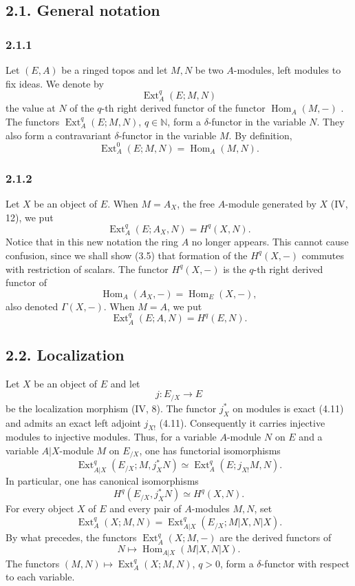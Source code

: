 \documentclass[11pt]{article}
\newcommand{\NN}{\mathbb N}
\newcommand{\Hom}{\operatorname{Hom}}
\newcommand{\Ext}{\operatorname{Ext}}
\begin{document}
\subsection*{2.1. General notation}

\subsubsection*{2.1.1}
Let $(E,A)$ be a ringed topos and let $M,N$ be two $A$-modules, left modules to fix ideas. We denote by
\[
\Ext_A^q(E;M,N)
\]
the value at $N$ of the $q$-th right derived functor of the functor $\Hom_A(M,-)$ \cite{11}. The functors $\Ext_A^q(E;M,N)$, $q\in\NN$, form a $\delta$-functor in the variable $N$. They also form a contravariant $\delta$-functor in the variable $M$. By definition,
\[
\Ext_A^0(E;M,N)=\Hom_A(M,N).
\]

\subsubsection*{2.1.2}
Let $X$ be an object of $E$. When $M=A_X$, the free $A$-module generated by $X$ (IV, 12), we put
\[
\Ext_A^q(E;A_X,N)=H^q(X,N).
\]
Notice that in this new notation the ring $A$ no longer appears. This cannot cause confusion, since we shall show (3.5) that formation of the $H^q(X,-)$ commutes with restriction of scalars. The functor $H^q(X,-)$ is the $q$-th right derived functor of
\[
\Hom_A(A_X,-)=\Hom_E(X,-),
\]
also denoted $\Gamma(X,-)$. When $M=A$, we put
\[
\Ext_A^q(E;A,N)=H^q(E,N).
\]

\subsection*{2.2. Localization}

Let $X$ be an object of $E$ and let
\[
j:E_{/X}\longrightarrow E
\]
be the localization morphism (IV, 8). The functor $j_X^*$ on modules is exact (4.11) and admits an exact left adjoint $j_{X!}$ (4.11). Consequently it carries injective modules to injective modules. Thus, for a variable $A$-module $N$ on $E$ and a variable $A|X$-module $M$ on $E_{/X}$, one has functorial isomorphisms
\[
\Ext^q_{A|X}(E_{/X};M,j_X^*N)
\simeq
\Ext_A^q(E;j_{X!}M,N).
\tag{2.2.1}
\]
In particular, one has canonical isomorphisms
\[
H^q(E_{/X},j_X^*N)\simeq H^q(X,N).
\]
For every object $X$ of $E$ and every pair of $A$-modules $M,N$, set
\[
\Ext_A^q(X;M,N)
=
\Ext^q_{A|X}(E_{/X};M|X,N|X).
\tag{2.2.2}
\]
By what precedes, the functors $\Ext_A^q(X;M,-)$ are the derived functors of
\[
N\longmapsto \Hom_{A|X}(M|X,N|X).
\]
The functors $(M,N)\mapsto \Ext_A^q(X;M,N)$, $q>0$, form a $\delta$-functor with respect to each variable.
\end{document}
